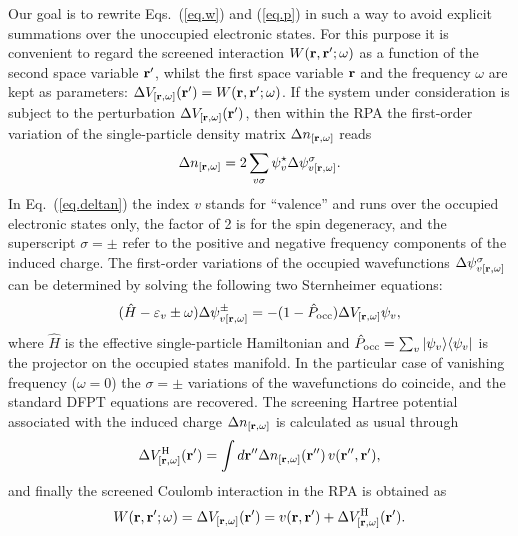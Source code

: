 \documentclass[twocolumn,prb,showpacs,superscriptaddress]{revtex4}
\def\s1{\hspace{0.5cm}}
\def\s2{\hspace{1cm}}
\def\w{\omega}
\def\H{\hat{H}}
\def\P{\hat{P}_{\rm occ}}
\def\E{\varepsilon}
\def\s{\sigma}
\def\r{{\bf r}}
\def\rp{{\bf r^\prime}}
\def\rpp{{\bf r^{\prime\prime}}}
\begin{document}
Our goal is to rewrite Eqs.\ (\ref{eq.w}) and (\ref{eq.p})
in such a way to avoid explicit summations over the unoccupied electronic states.
For this purpose it is convenient to regard the screened interaction
$W(\r,\rp;\w)$ as a function of the 
second space variable $\rp$, whilst the first space variable 
$\r$ and the frequency $\w$ are kept as parameters: $\Delta V_{[\r,\w]}(\rp) = W(\r,\rp;\w)$.
If the system under consideration is subject to the perturbation
$\Delta V_{[\r,\w]}(\rp)$, then within the RPA the first-order variation 
of the single-particle density matrix $\Delta n_{[\r,\w]}$ reads
  \begin{equation}\label{eq.deltan}
  \Delta n_{[\r,\w]} = 2\sum_{v\s} \psi_v^\star  \Delta \psi^\s_{v[\r,\w]}.
  \end{equation}
In Eq.\ (\ref{eq.deltan}) the index $v$ stands for ``valence'' and runs
over the occupied electronic states only, the factor of 2 is for the spin degeneracy, 
and the superscript $\sigma=\pm$ refer to the positive and negative
frequency components of the induced charge.
The first-order variations of the occupied wavefunctions $\Delta \psi^\s_{v[\r,\w]}$
can be determined by solving the following two Sternheimer equations:
  \begin{equation}\label{eq.linsys.1}
  (\H-\E_v\pm\w) \Delta \psi^\pm_{v[\r,\w]}  = -(1-\P)  \Delta V_{[\r,\w]} \psi_v, 
  \end{equation}
where $\H$ is the effective single-particle Hamiltonian and 
$\P=\sum_v |\psi_v\rangle\langle\psi_v|$ is the projector
on the occupied states manifold. 
In the particular case of vanishing frequency ($\w=0$)
the $\sigma=\pm$ variations of the wavefunctions do coincide,
and the standard DFPT equations are recovered.
The screening Hartree potential associated with the induced charge 
$\Delta n_{[\r,\w]}$ is calculated as usual through
  \begin{equation}\label{eq.dhartree}
  \Delta V^{\rm H}_{[\r,\w]}(\rp) = \int d\rpp \Delta n_{[\r,\w]} (\rpp) \, v(\rpp,\rp),
  \end{equation}
and finally the screened Coulomb interaction in the RPA is obtained as 
  \begin{equation}\label{eq.w.dfpt}
  W(\r,\rp;\w) = \Delta V_{[\r,\w]}(\rp) = v(\r,\rp) + \Delta V^{\rm H}_{[\r,\w]}(\rp).
  \end{equation}
\end{document}
